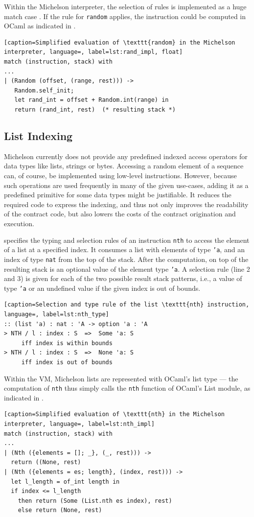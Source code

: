 Within the Michelson interpreter, the selection of rules is implemented as a huge match case \cite{tezos_repo}. If the rule for \texttt{random} applies, the instruction could be computed in OCaml as indicated in .
\begin{lstlisting}[caption=Simplified evaluation of \texttt{random} in the Michelson interpreter, language=, label=lst:rand_impl, float]
match (instruction, stack) with
...
| (Random (offset, (range, rest))) ->
   Random.self_init;
   let rand_int = offset + Random.int(range) in
   return (rand_int, rest)  (* resulting stack *)
\end{lstlisting}

\subsection{List Indexing}\label{sec:nth}
Michelson currently does not provide any predefined indexed access operators for data types like lists, strings or bytes. Accessing a random element of a sequence can, of course, be implemented using low-level instructions. However, because such operations are used frequently in many of the given use-cases, adding it as a predefined primitive for some data types might be justifiable. It reduces the required code to express the indexing, and thus not only improves the readability of the contract code, but also lowers the costs of the contract origination and execution.

 specifies the typing and selection rules of an instruction \texttt{nth} to access the element of a list at a specified index. It consumes a list with elements of type \texttt{'a}, and an index of type \texttt{nat} from the top of the stack. After the computation, on top of the resulting stack is an optional value of the element type \texttt{'a}. A selection rule (line 2 and 3) is given for each of the two possible result stack patterns, i.e., a value of type \texttt{'a} or an undefined value if the given index is out of bounds.
\begin{lstlisting}[caption=Selection and type rule of the list \texttt{nth} instruction, language=, label=lst:nth_type]
:: (list 'a) : nat : 'A -> option 'a : 'A
> NTH / l : index : S  =>  Some 'a: S
     iff index is within bounds
> NTH / l : index : S  =>  None 'a: S
     iff index is out of bounds
\end{lstlisting}

Within the VM, Michelson lists are represented with OCaml's list type --- the computation of \texttt{nth} thus simply calls the \texttt{nth} function of OCaml's List module, as indicated in . \\
\begin{lstlisting}[caption=Simplified evaluation of \texttt{nth} in the Michelson interpreter, language=, label=lst:nth_impl]
match (instruction, stack) with
...
| (Nth ({elements = []; _}, (_, rest))) ->
  return ((None, rest)
| (Nth ({elements = es; length}, (index, rest))) ->
  let l_length = of_int length in
  if index <= l_length
    then return (Some (List.nth es index), rest)
    else return (None, rest)
\end{lstlisting}
\lstset{upquote=false}

